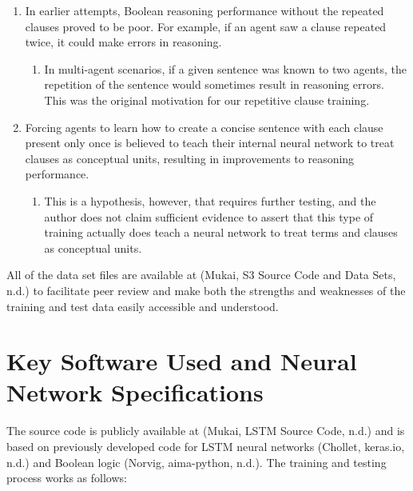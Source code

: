 \documentclass[
]{article}
\begin{document}
\begin{enumerate}
\def\labelenumi{\arabic{enumi}.}
\item
  In earlier attempts, Boolean reasoning performance without the
  repeated clauses proved to be poor. For example, if an agent saw a
  clause repeated twice, it could make errors in reasoning.

  \begin{enumerate}
  \def\labelenumii{\alph{enumii}.}
  \item
    In multi-agent scenarios, if a given sentence was known to two
    agents, the repetition of the sentence would sometimes result in
    reasoning errors. This was the original motivation for our
    repetitive clause training.
  \end{enumerate}
\item
  Forcing agents to learn how to create a concise sentence with each
  clause present only once is believed to teach their internal neural
  network to treat clauses as conceptual units, resulting in
  improvements to reasoning performance.

  \begin{enumerate}
  \def\labelenumii{\alph{enumii}.}
  \item
    This is a hypothesis, however, that requires further testing, and
    the author does not claim sufficient evidence to assert that this
    type of training actually does teach a neural network to treat terms
    and clauses as conceptual units.
  \end{enumerate}
\end{enumerate}

All of the data set files are available at (Mukai, S3 Source Code and
Data Sets, n.d.) to facilitate peer review and make both the strengths
and weaknesses of the training and test data easily accessible and
understood.

\hypertarget{key-software-used-and-neural-network-specifications}{%
\section{Key Software Used and Neural Network
Specifications}\label{key-software-used-and-neural-network-specifications}}

The source code is publicly available at (Mukai, LSTM Source Code, n.d.)
and is based on previously developed code for LSTM neural networks
(Chollet, keras.io, n.d.) and Boolean logic (Norvig, aima-python, n.d.).
The training and testing process works as follows:
\end{document}
